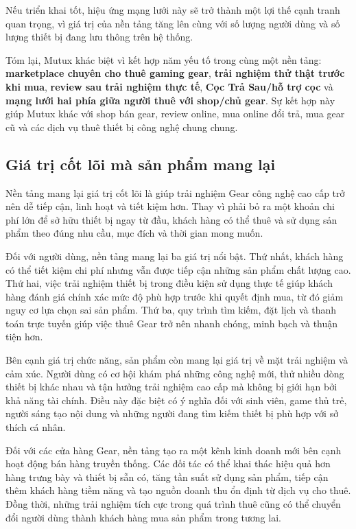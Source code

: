 Nếu triển khai tốt, hiệu ứng mạng lưới này sẽ trở thành một lợi thế cạnh tranh quan trọng, vì giá trị của nền tảng tăng lên cùng với số lượng người dùng và số lượng thiết bị đang lưu thông trên hệ thống.

Tóm lại, Mutux khác biệt vì kết hợp năm yếu tố trong cùng một nền tảng: \textbf{marketplace chuyên cho thuê gaming gear}, \textbf{trải nghiệm thử thật trước khi mua}, \textbf{review sau trải nghiệm thực tế}, \textbf{Cọc Trả Sau/hỗ trợ cọc} và \textbf{mạng lưới hai phía giữa người thuê với shop/chủ gear}. Sự kết hợp này giúp Mutux khác với shop bán gear, review online, mua online đổi trả, mua gear cũ và các dịch vụ thuê thiết bị công nghệ chung chung.


\subsection{Giá trị cốt lõi mà sản phẩm mang lại}
    Nền tảng mang lại giá trị cốt lõi là giúp trải nghiệm Gear công nghệ cao cấp trở nên dễ tiếp cận, linh hoạt và tiết kiệm hơn. Thay vì phải bỏ ra một khoản chi phí lớn để sở hữu thiết bị ngay từ đầu, khách hàng có thể thuê và sử dụng sản phẩm theo đúng nhu cầu, mục đích và thời gian mong muốn.

    Đối với người dùng, nền tảng mang lại ba giá trị nổi bật. Thứ nhất, khách hàng có thể tiết kiệm chi phí nhưng vẫn được tiếp cận những sản phẩm chất lượng cao. Thứ hai, việc trải nghiệm thiết bị trong điều kiện sử dụng thực tế giúp khách hàng đánh giá chính xác mức độ phù hợp trước khi quyết định mua, từ đó giảm nguy cơ lựa chọn sai sản phẩm. Thứ ba, quy trình tìm kiếm, đặt lịch và thanh toán trực tuyến giúp việc thuê Gear trở nên nhanh chóng, minh bạch và thuận tiện hơn.

    Bên cạnh giá trị chức năng, sản phẩm còn mang lại giá trị về mặt trải nghiệm và cảm xúc. Người dùng có cơ hội khám phá những công nghệ mới, thử nhiều dòng thiết bị khác nhau và tận hưởng trải nghiệm cao cấp mà không bị giới hạn bởi khả năng tài chính. Điều này đặc biệt có ý nghĩa đối với sinh viên, game thủ trẻ, người sáng tạo nội dung và những người đang tìm kiếm thiết bị phù hợp với sở thích cá nhân.

    Đối với các cửa hàng Gear, nền tảng tạo ra một kênh kinh doanh mới bên cạnh hoạt động bán hàng truyền thống. Các đối tác có thể khai thác hiệu quả hơn hàng trưng bày và thiết bị sẵn có, tăng tần suất sử dụng sản phẩm, tiếp cận thêm khách hàng tiềm năng và tạo nguồn doanh thu ổn định từ dịch vụ cho thuê. Đồng thời, những trải nghiệm tích cực trong quá trình thuê cũng có thể chuyển đổi người dùng thành khách hàng mua sản phẩm trong tương lai.

